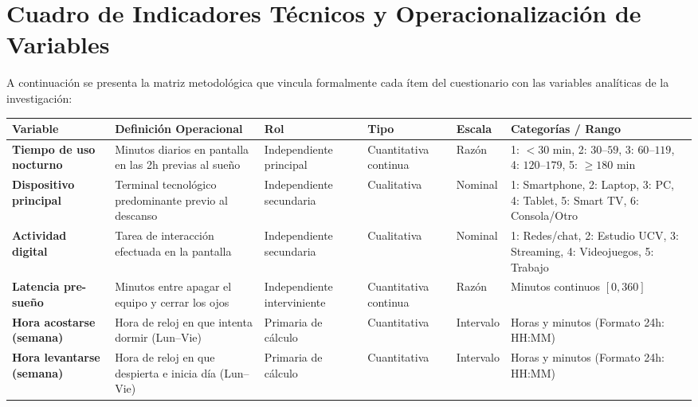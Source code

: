 \documentclass[12pt, letterpaper]{article}
\begin{document}
\newpage

\section*{Cuadro de Indicadores Técnicos y Operacionalización de Variables}

A continuación se presenta la matriz metodológica que vincula formalmente cada ítem del cuestionario con las variables analíticas de la investigación:

\vspace{0.2cm}

\begin{table}[H]
    \centering
    \footnotesize
    \begin{tabularx}{\textwidth}{p{3.2cm}p{3.8cm}lllX}
        \toprule
        \textbf{Variable} & \textbf{Definición Operacional} & \textbf{Rol} & \textbf{Tipo} & \textbf{Escala} & \textbf{Categorías / Rango} \\
        \midrule
        \textbf{Tiempo de uso nocturno} & Minutos diarios en pantalla en las 2h previas al sueño & Independiente principal & Cuantitativa continua & Razón & 1: $<30$ min, 2: $30\text{--}59$, 3: $60\text{--}119$, 4: $120\text{--}179$, 5: $\ge 180$ min \\
        \addlinespace
        \textbf{Dispositivo principal} & Terminal tecnológico predominante previo al descanso & Independiente secundaria & Cualitativa & Nominal & 1: Smartphone, 2: Laptop, 3: PC, 4: Tablet, 5: Smart TV, 6: Consola/Otro \\
        \addlinespace
        \textbf{Actividad digital} & Tarea de interacción efectuada en la pantalla & Independiente secundaria & Cualitativa & Nominal & 1: Redes/chat, 2: Estudio UCV, 3: Streaming, 4: Videojuegos, 5: Trabajo \\
        \addlinespace
        \textbf{Latencia pre-sueño} & Minutos entre apagar el equipo y cerrar los ojos & Independiente interviniente & Cuantitativa continua & Razón & Minutos continuos $[0, 360]$ \\
        \addlinespace
        \textbf{Hora acostarse (semana)} & Hora de reloj en que intenta dormir (Lun--Vie) & Primaria de cálculo & Cuantitativa & Intervalo & Horas y minutos (Formato 24h: HH:MM) \\
        \addlinespace
        \textbf{Hora levantarse (semana)} & Hora de reloj en que despierta e inicia día (Lun--Vie) & Primaria de cálculo & Cuantitativa & Intervalo & Horas y minutos (Formato 24h: HH:MM) \\

\end{tabularx}
\end{table}
\end{document}
